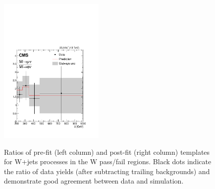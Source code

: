 \begin{figure}
\includegraphics[width=0.45\textwidth]{figures/pullsImpact/ratio_wmn_wen_shapes_fit_b.pdf}\\
\caption{Ratios of pre-fit (left column) and post-fit (right column) templates for W+jets processes in the W pass/fail regions. Black dots indicate the ratio of data yields (after subtracting trailing backgrounds) and demonstrate good agreement between data and simulation.}
\label{wwratios}
\end{figure}

\clearpage

